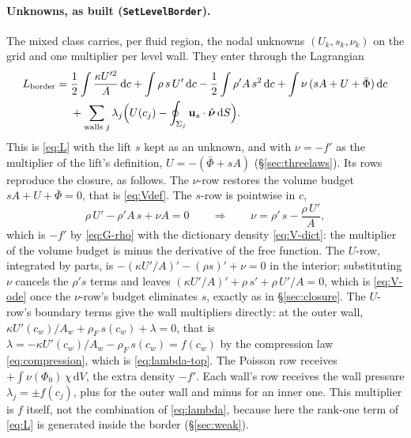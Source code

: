 \documentclass[11pt]{article}
\theoremstyle{definition}
\theoremstyle{remark}
\newcommand{\bu}{\mathbf{u}}
\newcommand{\dS}{\,\mathrm{d}S}
\newcommand{\dV}{\,\mathrm{d}V}
\newcommand{\dc}{\,\mathrm{d}c}
\newcommand{\code}[1]{\texttt{#1}}
\newcommand{\nuh}{\hat{\boldsymbol{\nu}}}
\begin{document}
\paragraph{Unknowns, as built (\code{SetLevelBorder}).} The mixed class
carries, per fluid region, the nodal unknowns $(U_k, s_k, \nu_k)$ on
the grid and one multiplier per level wall. They enter through the
Lagrangian
\begin{equation}
\begin{aligned}
  L_{\mathrm{border}} ={}& \frac12\int\frac{\kappa U'^2}{A}\dc
  + \int\rho\,s\,U'\dc - \frac12\int\rho' A\,s^2\dc
  + \int\nu\,(sA + U + \bar\Phi)\dc \\
  &+ \sum_{\text{walls } j}\lambda_j\Bigl(U(c_j) - \oint_{\Sigma_j}\bu_s\cdot\nuh\dS\Bigr).
\end{aligned}
\label{eq:L-built}
\end{equation}
This is \eqref{eq:L} with the lift $s$ kept as an unknown, and with
$\nu = -f'$ as the multiplier of the lift's definition, $U =
-(\bar\Phi + sA)$ (\S\ref{sec:threelaws}). Its rows reproduce the closure, as
follows. The $\nu$-row restores the volume budget $sA + U + \bar\Phi
= 0$, that is \eqref{eq:Vdef}. The $s$-row is pointwise in $c$,
\begin{equation*}
  \rho\,U' - \rho' A\,s + \nu A = 0
  \qquad\Longrightarrow\qquad
  \nu = \rho'\,s - \frac{\rho\,U'}{A} ,
\end{equation*}
which is $-f'$ by \eqref{eq:G-rho} with the dictionary density
\eqref{eq:V-dict}: the multiplier of the volume budget is minus the
derivative of the free function. The $U$-row, integrated by parts, is
$-(\kappa U'/A)' - (\rho s)' + \nu = 0$ in the interior; substituting
$\nu$ cancels the $\rho' s$ terms and leaves $(\kappa U'/A)' +
\rho\,s' + \rho\,U'/A = 0$, which is \eqref{eq:V-ode} once the
$\nu$-row's budget eliminates $s$, exactly as in \S\ref{sec:closure}.
The $U$-row's boundary terms give the wall multipliers directly: at
the outer wall, $\kappa U'(c_w)/A_w + \rho_F\,s(c_w) + \lambda = 0$,
that is $\lambda = -\kappa U'(c_w)/A_w - \rho_F\,s(c_w) = f(c_w)$ by
the compression law \eqref{eq:compression}, which is
\eqref{eq:lambda-top}. The Poisson row
receives $+\int\nu(\Phi_0)\,\chi\dV$, the extra density $-f'$. Each
wall's row receives the wall pressure $\lambda_j = \pm f(c_j)$, plus for
the outer wall and minus for an inner one. This multiplier is $f$
itself, not the combination of \eqref{eq:lambda}, because here the
rank-one term of \eqref{eq:L} is generated inside the border
(\S\ref{sec:weak}).
\end{document}
